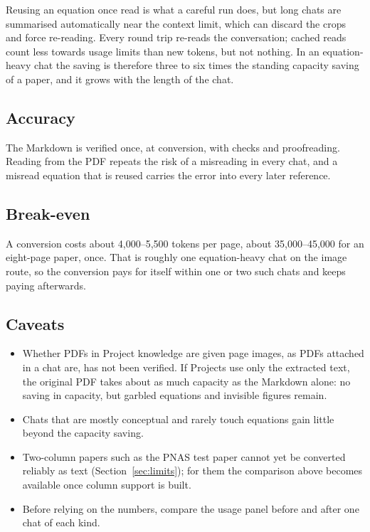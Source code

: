 \documentclass[11pt]{article}
\begin{document}
Reusing an equation once read is what a careful run does, but long chats are
summarised automatically near the context limit, which can discard the crops and
force re-reading. Every round trip re-reads the conversation; cached reads count
less towards usage limits than new tokens, but not nothing. In an
equation-heavy chat the saving is therefore three to six times the standing
capacity saving of a paper, and it grows with the length of the chat.

\subsection{Accuracy}

The Markdown is verified once, at conversion, with checks and proofreading.
Reading from the PDF repeats the risk of a misreading in every chat, and a
misread equation that is reused carries the error into every later reference.

\subsection{Break-even}

A conversion costs about 4{,}000--5{,}500 tokens per page, about
35{,}000--45{,}000 for an eight-page paper, once. That is roughly one
equation-heavy chat on the image route, so the conversion pays for itself within
one or two such chats and keeps paying afterwards.

\subsection{Caveats}

\begin{itemize}
\item Whether PDFs in Project knowledge are given page images, as PDFs attached
  in a chat are, has not been verified. If Projects use only the extracted text,
  the original PDF takes about as much capacity as the Markdown alone: no saving
  in capacity, but garbled equations and invisible figures remain.
\item Chats that are mostly conceptual and rarely touch equations gain little
  beyond the capacity saving.
\item Two-column papers such as the PNAS test paper cannot yet be converted
  reliably as text (Section~\ref{sec:limits}); for them the comparison above
  becomes available once column support is built.
\item Before relying on the numbers, compare the usage panel before and after
  one chat of each kind.
\end{itemize}
\end{document}
